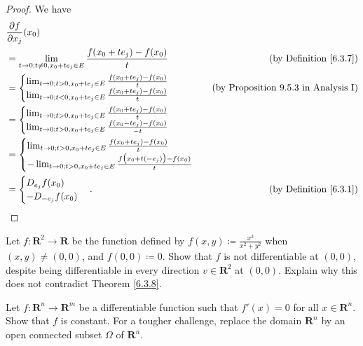 \begin{proof}
    We have
    \begin{align*}
         & \frac{\partial f}{\partial x_j}(x_0)                                                                                           \\
         & = \lim_{t \to 0 ; t \neq 0, x_0 + t e_j \in E} \frac{f(x_0 + t e_j) - f(x_0)}{t} & \text{(by Definition \ref{6.3.7})}          \\
         & = \begin{cases}
            \lim_{t \to 0 ; t > 0, x_0 + t e_j \in E} \frac{f(x_0 + t e_j) - f(x_0)}{t} \\
            \lim_{t \to 0 ; t < 0, x_0 + t e_j \in E} \frac{f(x_0 + t e_j) - f(x_0)}{t}
        \end{cases}                                                     & \text{(by Proposition 9.5.3 in Analysis I)} \\
         & = \begin{cases}
            \lim_{t \to 0 ; t > 0, x_0 + t e_j \in E} \frac{f(x_0 + t e_j) - f(x_0)}{t} \\
            \lim_{t \to 0 ; t > 0, x_0 + t e_j \in E} \frac{f(x_0 - t e_j) - f(x_0)}{-t}
        \end{cases}                                                                                                   \\
         & = \begin{cases}
            \lim_{t \to 0 ; t > 0, x_0 + t e_j \in E} \frac{f(x_0 + t e_j) - f(x_0)}{t} \\
            -\lim_{t \to 0 ; t > 0, x_0 + t e_j \in E} \frac{f\big(x_0 + t (-e_j)\big) - f(x_0)}{t}
        \end{cases}                                                                                                   \\
         & = \begin{cases}
            D_{e_j} f(x_0) \\
            - D_{-e_j} f(x_0)
        \end{cases}.                                                    & \text{(by Definition \ref{6.3.1})}
    \end{align*}
\end{proof}

\begin{exercise}\label{ex 6.3.3}
    Let \(f : \mathbf{R}^2 \to \mathbf{R}\) be the function deﬁned by \(f(x, y) \coloneqq \frac{x^3}{x^2 + y^2}\) when \((x, y) \neq (0, 0)\), and \(f(0, 0) \coloneqq 0\).
    Show that \(f\) is not differentiable at \((0, 0)\), despite being differentiable in every direction \(v \in \mathbf{R}^2\) at \((0, 0)\).
    Explain why this does not contradict Theorem \ref{6.3.8}.
\end{exercise}

\begin{exercise}\label{ex 6.3.4}
    Let \(f : \mathbf{R}^n \to \mathbf{R}^m\) be a differentiable function such that \(f'(x) = 0\) for all \(x \in \mathbf{R}^n\).
    Show that \(f\) is constant.
    For a tougher challenge, replace the domain \(\mathbf{R}^n\) by an open connected subset \(\Omega\) of \(\mathbf{R}^n\).
\end{exercise}